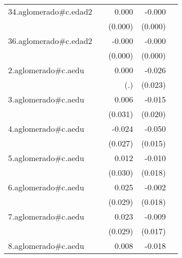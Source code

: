 {\begin{longtable}{l*{4}{D{.}{.}{-1}}}
\addlinespace
34.aglomerado#c.edad2&                     &       0.000         &      -0.000         &                     \\
            &                     &     (0.000)         &     (0.000)         &                     \\
\addlinespace
36.aglomerado#c.edad2&                     &      -0.000         &      -0.000         &                     \\
            &                     &     (0.000)         &     (0.000)         &                     \\
\addlinespace
2.aglomerado#c.aedu&                     &       0.000         &      -0.026         &                     \\
            &                     &         (.)         &     (0.023)         &                     \\
\addlinespace
3.aglomerado#c.aedu&                     &       0.006         &      -0.015         &                     \\
            &                     &     (0.031)         &     (0.020)         &                     \\
\addlinespace
4.aglomerado#c.aedu&                     &      -0.024         &      -0.050\sym{***}&                     \\
            &                     &     (0.027)         &     (0.015)         &                     \\
\addlinespace
5.aglomerado#c.aedu&                     &       0.012         &      -0.010         &                     \\
            &                     &     (0.030)         &     (0.018)         &                     \\
\addlinespace
6.aglomerado#c.aedu&                     &       0.025         &      -0.002         &                     \\
            &                     &     (0.029)         &     (0.018)         &                     \\
\addlinespace
7.aglomerado#c.aedu&                     &       0.023         &      -0.009         &                     \\
            &                     &     (0.029)         &     (0.017)         &                     \\
\addlinespace
8.aglomerado#c.aedu&                     &       0.008         &      -0.018         &                     \\

\end{longtable}}
